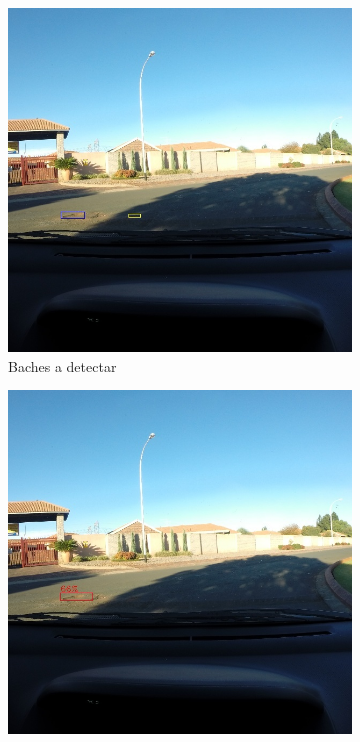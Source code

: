 \begin{figure}[H]
	\centering
	\begin{subfigure}[h]{0.45\linewidth}
		\includegraphics[width=\linewidth]{images/results_a_gt.jpg}
		\caption{Baches a detectar}
	\end{subfigure}
	\begin{subfigure}[h]{0.45\linewidth}
		\includegraphics[width=\linewidth]{images/results_a_yolo_v3_256.jpg}

\end{subfigure}
\end{figure}
